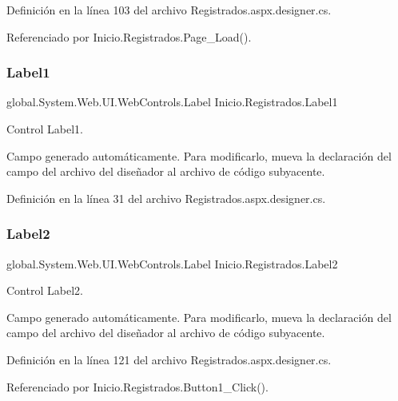 Definición en la línea 103 del archivo Registrados.\+aspx.\+designer.\+cs.



Referenciado por Inicio.\+Registrados.\+Page\+\_\+\+Load().

\mbox{\label{classInicio_1_1Registrados_a89cbfd8509272c14e26ee466a11b7835}} 
\subsubsection{\texorpdfstring{Label1}{Label1}}
{\footnotesize\ttfamily global.\+System.\+Web.\+U\+I.\+Web\+Controls.\+Label Inicio.\+Registrados.\+Label1\hspace{0.3cm}{\ttfamily [protected]}}



Control Label1. 

Campo generado automáticamente. Para modificarlo, mueva la declaración del campo del archivo del diseñador al archivo de código subyacente. 

Definición en la línea 31 del archivo Registrados.\+aspx.\+designer.\+cs.

\mbox{\label{classInicio_1_1Registrados_ab7c3cf09be993fe6a07f31881ba27159}} 
\subsubsection{\texorpdfstring{Label2}{Label2}}
{\footnotesize\ttfamily global.\+System.\+Web.\+U\+I.\+Web\+Controls.\+Label Inicio.\+Registrados.\+Label2\hspace{0.3cm}{\ttfamily [protected]}}



Control Label2. 

Campo generado automáticamente. Para modificarlo, mueva la declaración del campo del archivo del diseñador al archivo de código subyacente. 

Definición en la línea 121 del archivo Registrados.\+aspx.\+designer.\+cs.



Referenciado por Inicio.\+Registrados.\+Button1\+\_\+\+Click().

